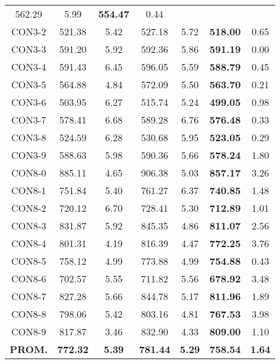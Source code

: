 \begin{table}[ht]
\begin{tabular}{c c c c c c c}
562.29 & 5.99 & \bf{554.47} & 
0.44\\CON3-2 & 521.38 & 5.42 & 
527.18 & 5.72 & \bf{518.00} & 
0.65\\CON3-3 & 591.20 & 5.92 & 
592.36 & 5.86 & \bf{591.19} & 
0.00\\CON3-4 & 591.43 & 6.45 & 
596.05 & 5.59 & \bf{588.79} & 
0.45\\CON3-5 & 564.88 & 4.84 & 
572.09 & 5.50 & \bf{563.70} & 
0.21\\CON3-6 & 503.95 & 6.27 & 
515.74 & 5.24 & \bf{499.05} & 
0.98\\CON3-7 & 578.41 & 6.68 & 
589.28 & 6.76 & \bf{576.48} & 
0.33\\CON3-8 & 524.59 & 6.28 & 
530.68 & 5.95 & \bf{523.05} & 
0.29\\CON3-9 & 588.63 & 5.98 & 
590.36 & 5.66 & \bf{578.24} & 
1.80\\CON8-0 & 885.11 & 4.65 & 
906.38 & 5.03 & \bf{857.17} & 
3.26\\CON8-1 & 751.84 & 5.40 & 
761.27 & 6.37 & \bf{740.85} & 
1.48\\CON8-2 & 720.12 & 6.70 & 
728.41 & 5.30 & \bf{712.89} & 
1.01\\CON8-3 & 831.87 & 5.92 & 
845.35 & 4.86 & \bf{811.07} & 
2.56\\CON8-4 & 801.31 & 4.19 & 
816.39 & 4.47 & \bf{772.25} & 
3.76\\CON8-5 & 758.12 & 4.99 & 
773.88 & 4.99 & \bf{754.88} & 
0.43\\CON8-6 & 702.57 & 5.55 & 
711.82 & 5.56 & \bf{678.92} & 
3.48\\CON8-7 & 827.28 & 5.66 & 
844.78 & 5.17 & \bf{811.96} & 
1.89\\CON8-8 & 798.06 & 5.42 & 
803.16 & 4.81 & \bf{767.53} & 
3.98\\CON8-9 & 817.87 & 3.46 & 
832.90 & 4.33 & \bf{809.00} & 
1.10\\\bf{PROM.} & 
\bf{772.32} & \bf{5.39} & \bf{781.44} & \bf{5.29} & \bf{758.54} & \bf{1.64}\\[1ex]\hline
\end{tabular}
\label{table:nonlin}
\end{table} \clearpage
